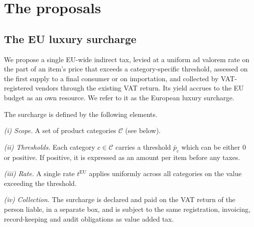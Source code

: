 \documentclass{article}
\newtheorem{definition}{Definition}
\begin{document}
\section{The proposals}


\subsection{The EU luxury surcharge} %

We propose a single EU-wide indirect tax, levied at a uniform ad valorem rate on the part of an item's price that exceeds a category-specific threshold, assessed on the first supply to a final consumer or on importation, and collected by VAT-registered vendors through the existing VAT return. Its yield accrues to the EU budget as an own resource. We refer to it as the European luxury surcharge.


The surcharge is defined by the following elements.

\emph{(i) Scope.} A set of product categories $\mathcal{C}$ (see below). %

\emph{(ii) Thresholds.} Each category $c \in \mathcal{C}$ carries a threshold $\bar{p}_c$ which can be either 0 or positive. If positive, it is expressed as an amount per item before any taxes.

\emph{(iii) Rate.} A single rate $t^{\mathrm{EU}}$ applies uniformly across all categories on the value exceeding the threshold. %

\emph{(iv) Collection.} The surcharge is declared and paid on the VAT return of the person liable, in a separate box, and is subject to the same registration, invoicing, record-keeping and audit obligations as value added tax.
\end{document}
